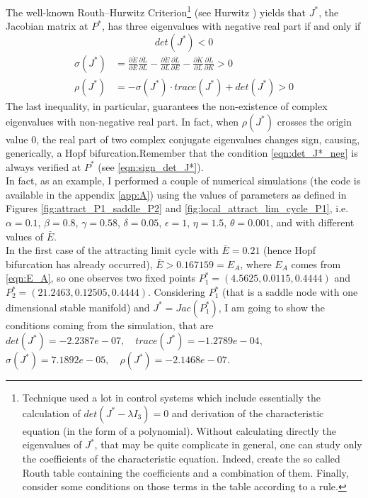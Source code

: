 The well-known Routh–Hurwitz Criterion\footnote{Technique used a lot in control systems which include essentially the calculation of $det(J^*-\lambda I_3)=0$ and derivation of the characteristic equation (in the form of a polynomial). Without calculating directly the eigenvalues of $J^*$, that may be quite complicate in general, one can study only the coefficients of the characteristic equation. Indeed, create the so called Routh table containing the coefficients and a combination of them. Finally, consider some conditions on those terms in the table according to a rule.} (see Hurwitz \cite{hurwitz_conditions_1964}) yields that $J^*$, the Jacobian matrix at $P^*$, has three eigenvalues with negative real part if and only if
\begin{equation} \label{eqn:det_J*_neg}
	det(J^*)<0
\end{equation}
\begin{equation} \label{eqn:cond_sigma_rho_stab}
	\begin{split}
		\sigma(J^*) &= \frac{\partial\dot{E}}{\partial E}\frac{\partial\dot{L}}{\partial L}-\frac{\partial\dot{E}}{\partial L}\frac{\partial\dot{L}}{\partial E}-\frac{\partial\dot{K}}{\partial L}\frac{\partial\dot{L}}{\partial K}>0\\
		\rho(J^*) &= -\sigma(J^*)\cdot trace(J^*)+det(J^*)>0
	\end{split}
\end{equation}
The last inequality, in particular, guarantees the non-existence of complex eigenvalues with non-negative real part. In fact, when $\rho(J^*)$ crosses the origin value $0$, the real part of two complex conjugate eigenvalues changes sign, causing, generically, a Hopf bifurcation.Remember that the condition \eqref{eqn:det_J*_neg} is always verified at $P^*$ (see \eqref{eqn:sign_det_J*}). \\
In fact, as an example, I performed a couple of numerical simulations (the code is available in the appendix \ref{app:A}) using the values of parameters as defined in Figures \ref{fig:attract_P1_saddle_P2} and \ref{fig:local_attract_lim_cycle_P1}, i.e. $\alpha=0.1$, $\beta=0.8$, $\gamma=0.58$, $\delta=0.05$, $\epsilon=1$, $\eta=1.5$, $\theta=0.001$, and with different values of $\bar{E}$.\\
In the first case of the attracting limit cycle with $\bar{E}=0.21$ (hence Hopf bifurcation has already occurred), $\bar{E}>0.167159=E_A$, where $E_A$ comes from \eqref{eqn:E_A}, so one observes two fixed points $P_1^*=(4.5625,0.0115,0.4444)$ and $P_2^*=(21.2463,0.12505,0.4444)$. Considering $P_1^*$ (that is a saddle node with one dimensional stable manifold) and $J^*=Jac(P_1^*)$, I am going to show the conditions coming from the simulation, that are \\$det(J^*)=-2.2387e-07,\quad trace(J^*)=-1.2789e-04,$\\ $\sigma(J^*)=7.1892e-05,\quad \rho(J^*)=-2.1468e-07$. \\
